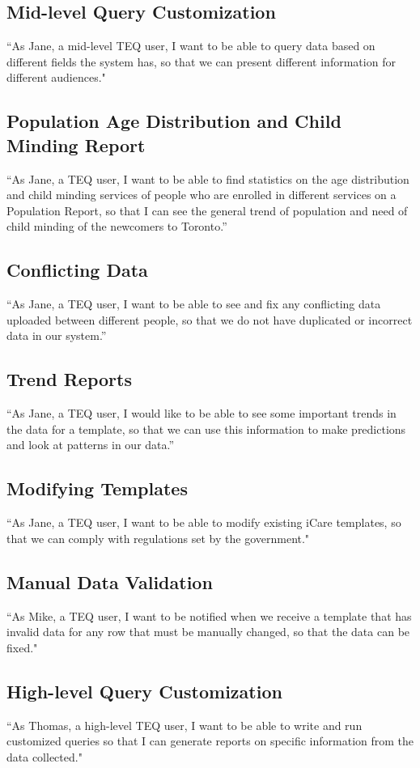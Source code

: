 \documentclass[12pt]{article}
\begin{document}
\subsection{Mid-level Query Customization}
``As Jane, a mid-level TEQ user, I want to be able to query data based on different fields the system has, so that we can present different information for different audiences."

\subsection{Population Age Distribution and Child Minding Report}
``As Jane, a TEQ user,  I want to be able to find statistics on the age distribution and child minding services of people who are enrolled in different services on a Population Report, so that I can see the general trend of population and need of child minding of the newcomers to Toronto.''

\subsection{Conflicting Data}
``As Jane, a TEQ user,  I want to be able to see and fix any conflicting data uploaded between different people, so that we do not have duplicated or incorrect data in our system.''

\subsection{Trend Reports}
``As Jane, a TEQ user, I would like to be able to see some important trends in the data for a template, so that we can use this information to make predictions and look at patterns in our data.''

\subsection{Modifying Templates}
``As Jane, a TEQ user,  I want to be able to modify existing iCare templates, so that we can comply with regulations set by the government."

\subsection{Manual Data Validation}
``As Mike, a TEQ user, I want to be notified when we receive a template that has invalid data for any row that must be manually changed, so that the data can be fixed."

\subsection{High-level Query Customization}
``As Thomas, a high-level TEQ user, I want to be able to write and run customized queries so that I can generate reports on specific information from the data collected."
\end{document}
